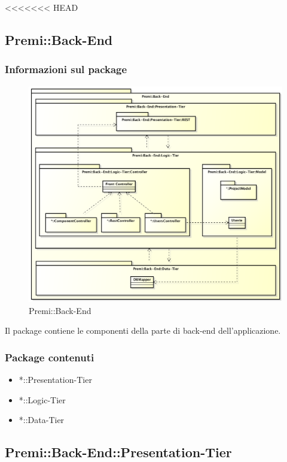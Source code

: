 <<<<<<< HEAD
\subsection{Premi::Back-End}
	\subsubsection{Informazioni sul package}
		\begin{figure}[h]
			\centering
			\includegraphics[width=\linewidth]{img/back-end-package}
			\caption[Premi::Back-End]{Premi::Back-End}
		\end{figure}
		Il package contiene le componenti della parte di back-end dell'applicazione.
		
	\subsubsection{Package contenuti}
		\begin{itemize}
			\item *::Presentation-Tier
			\item *::Logic-Tier
			\item *::Data-Tier
		\end{itemize}


\subsection{Premi::Back-End::Presentation-Tier}
